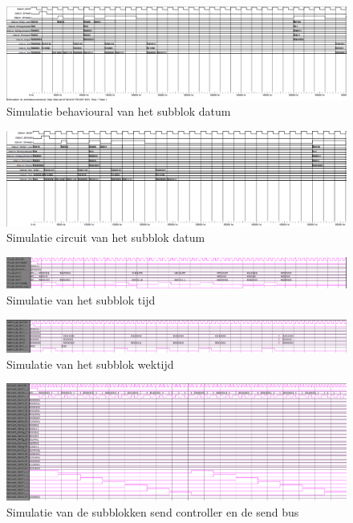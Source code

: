 \begin{figure}[h!]
\includegraphics[width=\textwidth,height=\textheight,keepaspectratio]{Figuren/LCD/resultaten/simulatie_datum_behavioural.png}
\caption{Simulatie behavioural van het subblok datum}
\label{fig:sim_datum_behavioural}
\end{figure}

\begin{figure}[h!]
\includegraphics[width=\textwidth,height=\textheight,keepaspectratio]{Figuren/LCD/resultaten/simulatie_datum_circuit.png}
\caption{Simulatie circuit van het subblok datum}
\label{fig:sim_datum_circuit}
\end{figure}

\begin{figure}[h!]
	\includegraphics[width=\textwidth,height=\textheight,keepaspectratio]{Figuren/LCD/resultaten/sim_tijd.png}
	\caption{Simulatie van het subblok tijd}
	\label{fig:sim_tijd}
\end{figure}

\begin{figure}[h!]
	\includegraphics[width=\textwidth,height=\textheight,keepaspectratio]{Figuren/LCD/resultaten/sim_wektijd.png}
	\caption{Simulatie van het subblok wektijd}
	\label{fig:sim_wektijd}
\end{figure}

\begin{figure}[h!]
	\includegraphics[width=\textwidth,height=\textheight,keepaspectratio]{Figuren/LCD/resultaten/sim_send_top.png}
	\caption{Simulatie van de subblokken send controller en de send bus}
	\label{fig:sim_send_top}
\end{figure}